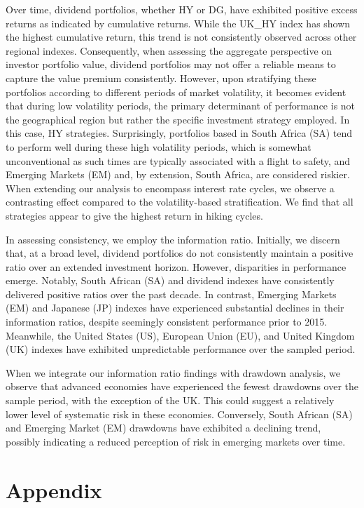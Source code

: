 \documentclass[12pt,preprint, authoryear]{elsarticle}
\numberwithin{equation}{section}
\numberwithin{figure}{section}
\numberwithin{table}{section}
\begin{document}
Over time, dividend portfolios, whether HY or DG, have exhibited
positive excess returns as indicated by cumulative returns. While the
UK\_HY index has shown the highest cumulative return, this trend is not
consistently observed across other regional indexes. Consequently, when
assessing the aggregate perspective on investor portfolio value,
dividend portfolios may not offer a reliable means to capture the value
premium consistently. However, upon stratifying these portfolios
according to different periods of market volatility, it becomes evident
that during low volatility periods, the primary determinant of
performance is not the geographical region but rather the specific
investment strategy employed. In this case, HY strategies. Surprisingly,
portfolios based in South Africa (SA) tend to perform well during these
high volatility periods, which is somewhat unconventional as such times
are typically associated with a flight to safety, and Emerging Markets
(EM) and, by extension, South Africa, are considered riskier. When
extending our analysis to encompass interest rate cycles, we observe a
contrasting effect compared to the volatility-based stratification. We
find that all strategies appear to give the highest return in hiking
cycles.

In assessing consistency, we employ the information ratio. Initially, we
discern that, at a broad level, dividend portfolios do not consistently
maintain a positive ratio over an extended investment horizon. However,
disparities in performance emerge. Notably, South African (SA) and
dividend indexes have consistently delivered positive ratios over the
past decade. In contrast, Emerging Markets (EM) and Japanese (JP)
indexes have experienced substantial declines in their information
ratios, despite seemingly consistent performance prior to 2015.
Meanwhile, the United States (US), European Union (EU), and United
Kingdom (UK) indexes have exhibited unpredictable performance over the
sampled period.

When we integrate our information ratio findings with drawdown analysis,
we observe that advanced economies have experienced the fewest drawdowns
over the sample period, with the exception of the UK. This could suggest
a relatively lower level of systematic risk in these economies.
Conversely, South African (SA) and Emerging Market (EM) drawdowns have
exhibited a declining trend, possibly indicating a reduced perception of
risk in emerging markets over time.

\newpage

\hypertarget{appendix}{%
\section{Appendix}\label{appendix}}
\end{document}
